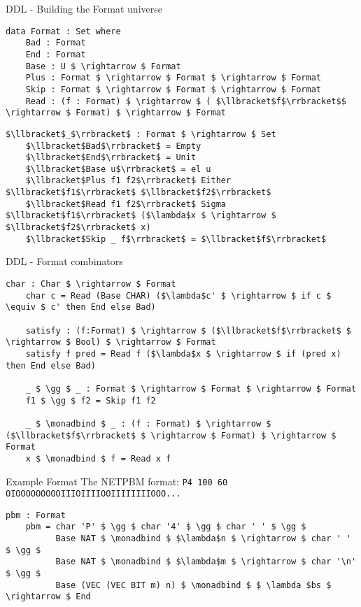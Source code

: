 \documentclass[10pt]{beamer}
\newcommand\monadbind{\gg\!\!=}
\begin{document}
\begin{frame}[fragile]{DDL - Building the Format universe}
	\begin{lstlisting}[mathescape=true]
	data Format : Set where
	Bad : Format
	End : Format
	Base : U $ \rightarrow $ Format
	Plus : Format $ \rightarrow $ Format $ \rightarrow $ Format
	Skip : Format $ \rightarrow $ Format $ \rightarrow $ Format
	Read : (f : Format) $ \rightarrow $ ( $\llbracket$f$\rrbracket$$ \rightarrow $ Format) $ \rightarrow $ Format
	\end{lstlisting}
	\begin{lstlisting}[mathescape=true]
	$\llbracket$_$\rrbracket$ : Format $ \rightarrow $ Set
	$\llbracket$Bad$\rrbracket$ = Empty
	$\llbracket$End$\rrbracket$ = Unit
	$\llbracket$Base u$\rrbracket$ = el u
	$\llbracket$Plus f1 f2$\rrbracket$ Either $\llbracket$f1$\rrbracket$ $\llbracket$f2$\rrbracket$
	$\llbracket$Read f1 f2$\rrbracket$ Sigma $\llbracket$f1$\rrbracket$ ($\lambda$x $ \rightarrow $ $\llbracket$f2$\rrbracket$ x)
	$\llbracket$Skip _ f$\rrbracket$ = $\llbracket$f$\rrbracket$
	\end{lstlisting}
\end{frame}

\begin{frame}[fragile]{DDL - Format combinators}
	\begin{lstlisting}[mathescape=true]
	char : Char $ \rightarrow $ Format
	char c = Read (Base CHAR) ($\lambda$c' $ \rightarrow $ if c $ \equiv $ c' then End else Bad)

	satisfy : (f:Format) $ \rightarrow $ ($\llbracket$f$\rrbracket$ $ \rightarrow $ Bool) $ \rightarrow $ Format
	satisfy f pred = Read f ($\lambda$x $ \rightarrow $ if (pred x) then End else Bad)

	_ $ \gg $ _ : Format $ \rightarrow $ Format $ \rightarrow $ Format
	f1 $ \gg $ f2 = Skip f1 f2

	_ $ \monadbind $ _ : (f : Format) $ \rightarrow $ ($\llbracket$f$\rrbracket$ $ \rightarrow $ Format) $ \rightarrow $ Format
	x $ \monadbind $ f = Read x f
	\end{lstlisting}
\end{frame}

\begin{frame}[fragile]{Example Format}
The NETPBM format:\newline
\texttt{P4 100 60}\newline
\texttt{OIOOOOOOOOOIIIOIIIIOOIIIIIIIIOOO...}

	\begin{lstlisting}[mathescape=true]
	pbm : Format
	pbm = char 'P' $ \gg $ char '4' $ \gg $ char ' ' $ \gg $
	      Base NAT $ \monadbind $ $\lambda$n $ \rightarrow $ char ' ' $ \gg $
	      Base NAT $ \monadbind $ $\lambda$m $ \rightarrow $ char '\n' $ \gg $
	      Base (VEC (VEC BIT m) n) $ \monadbind $ $ \lambda $bs $ \rightarrow $ End
	\end{lstlisting}
\end{frame}
\end{document}

